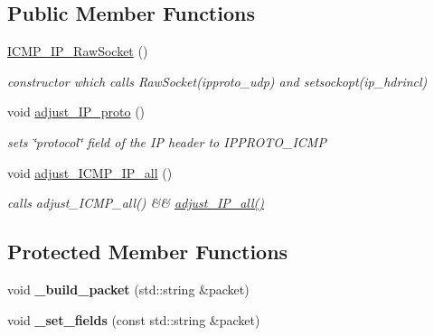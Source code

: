 \subsection*{Public Member Functions}
\begin{CompactItemize}
\item 
\hypertarget{classsocketpp_1_1ICMP__IP__RawSocket_c94fd53fce785a8b9ac5e53c8b1fb694}{
\hyperlink{classsocketpp_1_1ICMP__IP__RawSocket_c94fd53fce785a8b9ac5e53c8b1fb694}{ICMP\_\-IP\_\-RawSocket} ()}
\label{classsocketpp_1_1ICMP__IP__RawSocket_c94fd53fce785a8b9ac5e53c8b1fb694}

\begin{CompactList}\small\item\em constructor which calls RawSocket(ipproto\_\-udp) and setsockopt(ip\_\-hdrincl) \item\end{CompactList}\item 
\hypertarget{classsocketpp_1_1ICMP__IP__RawSocket_93c4cd4bb7a9afb65dd3e170cb93896e}{
void \hyperlink{classsocketpp_1_1ICMP__IP__RawSocket_93c4cd4bb7a9afb65dd3e170cb93896e}{adjust\_\-IP\_\-proto} ()}
\label{classsocketpp_1_1ICMP__IP__RawSocket_93c4cd4bb7a9afb65dd3e170cb93896e}

\begin{CompactList}\small\item\em sets \char`\"{}protocol\char`\"{} field of the IP header to IPPROTO\_\-ICMP \item\end{CompactList}\item 
\hypertarget{classsocketpp_1_1ICMP__IP__RawSocket_c3f54f7a266586af46e4bfa4494f90d6}{
void \hyperlink{classsocketpp_1_1ICMP__IP__RawSocket_c3f54f7a266586af46e4bfa4494f90d6}{adjust\_\-ICMP\_\-IP\_\-all} ()}
\label{classsocketpp_1_1ICMP__IP__RawSocket_c3f54f7a266586af46e4bfa4494f90d6}

\begin{CompactList}\small\item\em calls adjust\_\-ICMP\_\-all() \&\& \hyperlink{classsocketpp_1_1IP__RawSocket_45e60510233daaa2f279d3a4706fdce5}{adjust\_\-IP\_\-all()} \item\end{CompactList}\end{CompactItemize}
\subsection*{Protected Member Functions}
\begin{CompactItemize}
\item 
\hypertarget{classsocketpp_1_1ICMP__IP__RawSocket_49a62078d6febf7a11b9350de1e23903}{
void \textbf{\_\-build\_\-packet} (std::string \&packet)}
\label{classsocketpp_1_1ICMP__IP__RawSocket_49a62078d6febf7a11b9350de1e23903}

\item 
\hypertarget{classsocketpp_1_1ICMP__IP__RawSocket_6d2f188d46030afa13f9c3971d43d518}{
void \textbf{\_\-set\_\-fields} (const std::string \&packet)}
\label{classsocketpp_1_1ICMP__IP__RawSocket_6d2f188d46030afa13f9c3971d43d518}

\end{CompactItemize}


